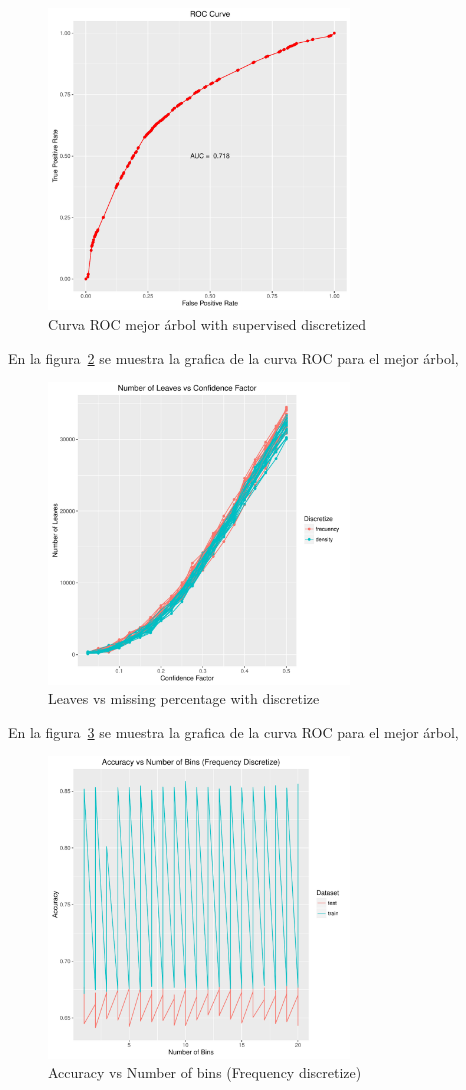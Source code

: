 \begin{figure}
  \centering
  \includegraphics[width = 8cm]{6c.pdf}
  \caption{Curva ROC mejor árbol with supervised discretized}
  \label{fig:6c}
\end{figure}

En la figura~\ref{fig:6d} se muestra la grafica de la curva ROC para el mejor árbol,

\begin{figure}
  \centering
  \includegraphics[width = 8cm]{6d.pdf}
  \caption{Leaves vs missing percentage with discretize}
  \label{fig:6d}
\end{figure}

En la figura~\ref{fig:6e} se muestra la grafica de la curva ROC para el mejor árbol,

\begin{figure}
  \centering
  \includegraphics[width = 8cm]{6e.pdf}
  \caption{Accuracy vs Number of bins (Frequency discretize)}
  \label{fig:6e}
\end{figure}

